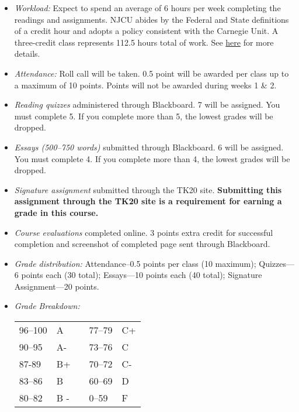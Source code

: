 \documentclass[article,oneside]{memoir}
\begin{document}
\begin{itemize}
\item \textit{Workload:} Expect to spend an average of 6 hours per week completing the readings and assignments. NJCU abides by the Federal and State definitions of a credit hour and adopts a policy consistent with the Carnegie Unit. A three-credit class represents 112.5 hours total of work. See \href{http://scoconno.github.io/Teaching/Credit.pdf}{here} for more details.

\item \textit{Attendance:} Roll call will be taken. 0.5 point will be awarded per class up to a maximum of 10 points. Points will not be awarded during weeks 1 \& 2. 

\item \textit{Reading quizzes} administered through Blackboard. 7 will be assigned. You must complete 5. If you complete more than 5, the lowest grades will be dropped. 


\item \textit{Essays (500--750 words)} submitted through Blackboard.  6 will be assigned. You must complete 4. If you complete more than 4, the lowest grades will be dropped. 

\item \textit{Signature assignment} submitted through the TK20 site. \textbf{Submitting this assignment through the TK20 site is a requirement for earning a grade in this course.}

\item \textit{Course evaluations} completed online. 3 points extra credit for successful completion  and screenshot of completed page sent through Blackboard. 
  
\item \textit{Grade distribution:} Attendance--0.5 points per class (10 maximum); Quizzes---6 points each (30 total);  Essays---10 points each (40 total); Signature Assignment---20 points.


\item \textit{Grade Breakdown:}

 \begin{tabular}{ | l | l | p{2cm} | l | l | }
    \hline 
96--100 & A  & &  77--79 &  C+ \\  
90--95 & A- & &  73--76 & C \\
87-89 & B+ &  &  70--72 & C- \\ 
83--86 & B  & &  60--69 & D\\
80--82 & B - & & 0--59 & F\\ \hline
    \end{tabular}


\end{itemize}
\end{document}
